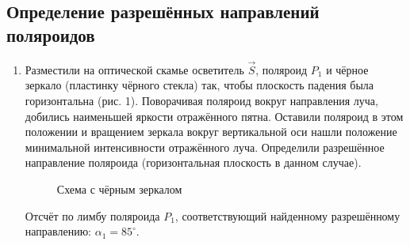 \documentclass[a4paper,12pt]{article}
\begin{document}
	\subsection*{Определение разрешённых направлений поляроидов}
	\begin{enumerate}
		\item Разместили на оптической скамье осветитель $\vec{S}$, поляроид $P_1$ и чёрное зеркало (пластинку чёрного стекла) так, чтобы плоскость падения была горизонтальна (рис. 1). Поворачивая поляроид вокруг направления луча, добились наименьшей яркости отражённого пятна. Оставили поляроид в этом положении и вращением зеркала вокруг вертикальной оси нашли положение минимальной интенсивности отражённого луча. Определили разрешённое направление поляроида (горизонтальная плоскость в данном случае).
		\begin{figure}
		\centering
		    \caption{Схема с чёрным зеркалом}
		\end{figure}
		
		Отсчёт по лимбу поляроида $P_1$, соответствующий найденному разрешённому направлению: $\alpha_1=85^\circ$.
				

\end{enumerate}
\end{document}
